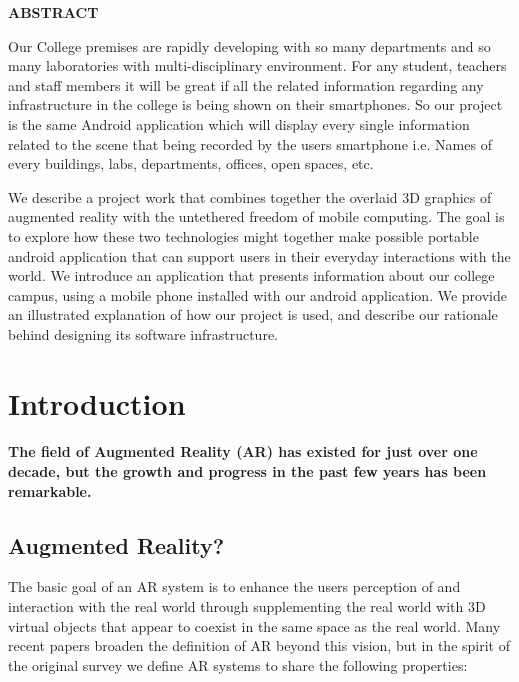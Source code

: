 \documentclass{article}
\begin{document}
\newpage
\begin{center}
{\LARGE \textbf{ ABSTRACT}}\\[1cm]
\end{center}
{\large
	\par Our College premises are rapidly developing with so many departments and so many laboratories with multi-disciplinary environment. For any student, teachers and staff members it will be great if all the related information regarding any infrastructure in the college is being shown on their smartphones. So our project is the same Android application which will display every single information related to the scene that being recorded by the users smartphone i.e. Names of every buildings, labs, departments, offices, open spaces, etc. 
	\par We describe a project work that combines together the overlaid 3D graphics of augmented reality with the untethered freedom of mobile computing. The goal is to explore how these two technologies might together make possible portable android application that can support users in their everyday interactions with the world. We introduce an application that presents information about our college campus, using a mobile phone installed with our android application. We provide an illustrated explanation of how our project is used, and describe our rationale behind designing its software infrastructure.
} 



\newpage
\large
\section{Introduction}
\paragraph{ The field of Augmented Reality (AR) has existed for just over one decade, but the growth and progress in the past few years has been remarkable. }
\subsection{Augmented Reality?}
\par The basic goal of an AR system is to enhance the users perception of and interaction with the real world through supplementing the real world with 3D virtual objects that appear to coexist in the same space as the real world.  Many recent papers broaden the definition of AR beyond this vision, but in the spirit of the original survey we define AR systems to share the following properties: 
\end{document}
